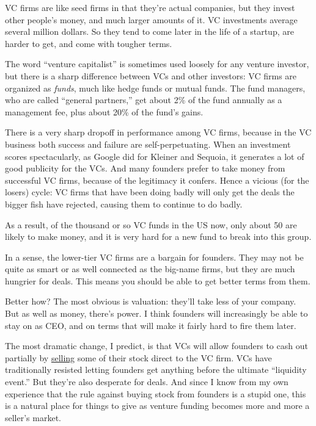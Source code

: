 VC firms are like seed firms in that they're actual companies, but they
invest other people's money, and much larger amounts of it. VC
investments average several million dollars. So they tend to come later
in the life of a startup, are harder to get, and come with tougher
terms.

The word ``venture capitalist'' is sometimes used loosely for any
venture investor, but there is a sharp difference between VCs and other
investors: VC firms are organized as \emph{funds}, much like hedge funds
or mutual funds. The fund managers, who are called ``general partners,''
get about 2\% of the fund annually as a management fee, plus about 20\%
of the fund's gains.

There is a very sharp dropoff in performance among VC firms, because in
the VC business both success and failure are self-perpetuating. When an
investment scores spectacularly, as Google did for Kleiner and Sequoia,
it generates a lot of good publicity for the VCs. And many founders
prefer to take money from successful VC firms, because of the legitimacy
it confers. Hence a vicious (for the losers) cycle: VC firms that have
been doing badly will only get the deals the bigger fish have rejected,
causing them to continue to do badly.

As a result, of the thousand or so VC funds in the US now, only about 50
are likely to make money, and it is very hard for a new fund to break
into this group.

In a sense, the lower-tier VC firms are a bargain for founders. They may
not be quite as smart or as well connected as the big-name firms, but
they are much hungrier for deals. This means you should be able to get
better terms from them.

Better how? The most obvious is valuation: they'll take less of your
company. But as well as money, there's power. I think founders will
increasingly be able to stay on as CEO, and on terms that will make it
fairly hard to fire them later.

The most dramatic change, I predict, is that VCs will allow founders to
cash out partially by \href{vcsqueeze.html}{selling} some of their stock
direct to the VC firm. VCs have traditionally resisted letting founders
get anything before the ultimate ``liquidity event.'' But they're also
desperate for deals. And since I know from my own experience that the
rule against buying stock from founders is a stupid one, this is a
natural place for things to give as venture funding becomes more and
more a seller's market.

